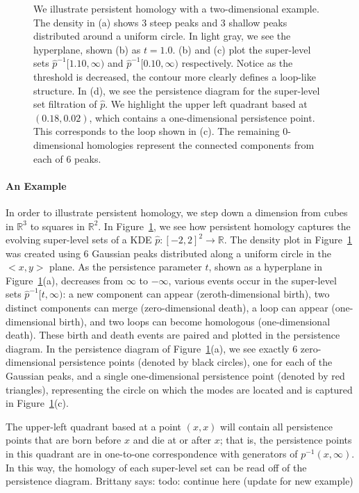 \documentclass[12pt]{article}
\newcommand{\brittany}[1]{{\color{cyan} Brittany says: #1}}
\newcommand{\figref}[1]{Figure~\ref{#1}}
\def\R{{\mathbb R}}
\begin{document}
\begin{figure}
  \caption{ We illustrate persistent homology with a two-dimensional example. The density in (a) shows 3 steep peaks and 3 shallow peaks  distributed around a uniform circle. In light gray, we see the hyperplane, shown (b) as $t=1.0$. (b) and (c) plot the super-level sets $\widehat{p}^{-1}[1.10,\infty)$ and $\widehat{p}^{-1}[0.10,\infty)$ respectively. Notice as the threshold is decreased, the contour more clearly defines a loop-like structure. In (d), we see the  persistence diagram for the super-level set filtration of $\widehat{p}$. We highlight the upper left quadrant based at $(0.18, 0.02)$, which contains a one-dimensional persistence point. This corresponds to the loop shown in (c). The remaining 0-dimensional homologies represent the connected components from each of 6 peaks.} %
    \label{fig:homologyexample}
\end{figure}

\paragraph{An Example}
In order to illustrate persistent homology, we step down a dimension from cubes in $\R^3$ to squares in $\R^2$. In \figref{fig:homologyexample}, we see how persistent homology captures the evolving super-level sets of a KDE $\widehat{p} \colon [-2,2]^2 \to \R$.  The density plot in \figref{fig:homologyexample} was created using 6 Gaussian peaks distributed along a uniform circle in the $<x,y>$ plane. As the persistence parameter $t$, shown as a hyperplane in \figref{fig:homologyexample}(a), decreases from $\infty$ to $-\infty$, various events occur in the super-level sets $\widehat{p}^{-1}[t,\infty)$: a new component can appear (zeroth-dimensional birth), two distinct components can merge (zero-dimensional death), a loop can appear (one-dimensional birth), and two loops can become homologous (one-dimensional death).  These birth and death events are paired and plotted in the persistence diagram.
%
In the persistence diagram of \figref{fig:homologyexample}(a), we see exactly 6 zero-dimensional persistence points (denoted by black circles), one for each of the Gaussian peaks, and a single one-dimensional persistence point (denoted by red triangles), representing the circle on which the modes are located and is captured in \figref{fig:homologyexample}(c).

The upper-left quadrant based at a point $(x,x)$ will contain all persistence points that are born before $x$ and die at or after $x$; that is, the persistence points in this quadrant are in one-to-one correspondence with generators of $p^{-1}(x,\infty)$.  In this way, the homology of each super-level set can be read off of the persistence diagram.  
\brittany{todo: continue here (update for new example)}
\end{document}
